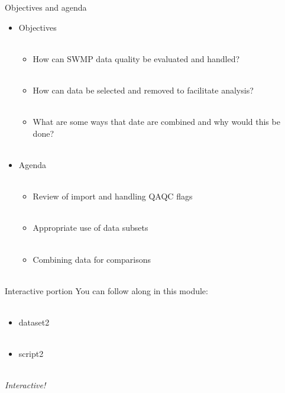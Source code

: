 \documentclass[xcolor=svgnames]{beamer}\usepackage[]{graphicx}\usepackage[]{color}
\begin{document}
\begin{frame}{Objectives and agenda}
\begin{itemize}
\onslide<+->
\item Objectives \\~\\
\begin{itemize}
\item How can SWMP data quality be evaluated and handled? \\~\\
\item How can data be selected and removed to facilitate analysis? \\~\\
\item What are some ways that date are combined and why would this be done? \\~\\
\end{itemize}
\onslide<+->
\item Agenda \\~\\
\begin{itemize}
\item Review of import and handling QAQC flags\\~\\
\item Appropriate use of data subsets \\~\\
\item Combining data for comparisons \\~\\
\end{itemize}
\end{itemize}
\end{frame}

\begin{frame}{Interactive portion}
You can follow along in this module: \\~\\
\begin{itemize}
\item dataset2 \\~\\
\item script2 \\~\\
\end{itemize}
\Large
\centerline{\emph{Interactive!}}
\end{frame}
\end{document}
